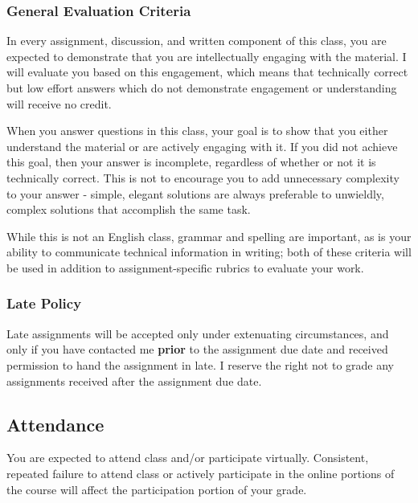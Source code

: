 \documentclass[
  11pt,
  letterpaper,
  DIV=11,
  numbers=noendperiod]{scrartcl}
\begin{document}
\hypertarget{general-evaluation-criteria}{%
\subsubsection{General Evaluation
Criteria}\label{general-evaluation-criteria}}

In every assignment, discussion, and written component of this class,
you are expected to demonstrate that you are intellectually engaging
with the material. I will evaluate you based on this engagement, which
means that technically correct but low effort answers which do not
demonstrate engagement or understanding will receive no credit.

When you answer questions in this class, your goal is to show that you
either understand the material or are actively engaging with it. If you
did not achieve this goal, then your answer is incomplete, regardless of
whether or not it is technically correct. This is not to encourage you
to add unnecessary complexity to your answer - simple, elegant solutions
are always preferable to unwieldly, complex solutions that accomplish
the same task.

While this is not an English class, grammar and spelling are important,
as is your ability to communicate technical information in writing; both
of these criteria will be used in addition to assignment-specific
rubrics to evaluate your work.

\hypertarget{late-policy}{%
\subsubsection{Late Policy}\label{late-policy}}

Late assignments will be accepted only under extenuating circumstances,
and only if you have contacted me \textbf{prior} to the assignment due
date and received permission to hand the assignment in late. I reserve
the right not to grade any assignments received after the assignment due
date.

\hypertarget{attendance}{%
\subsection{Attendance}\label{attendance}}

You are expected to attend class and/or participate virtually.
Consistent, repeated failure to attend class or actively participate in
the online portions of the course will affect the participation portion
of your grade.
\end{document}

